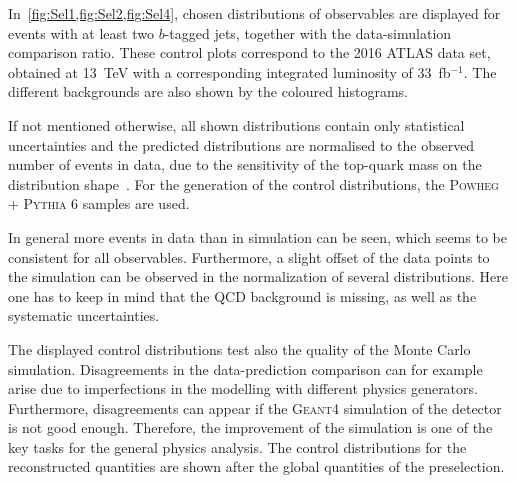 In~\cref{fig:Sel1,fig:Sel2,fig:Sel4}, chosen distributions of observables are displayed for events with at least two $b$-tagged jets, together with the data-simulation comparison ratio. These control plots correspond to the  2016 ATLAS data set, obtained at 13~TeV with a corresponding integrated luminosity of 33~fb$^{-1}$. The different backgrounds are also shown by the coloured histograms. 

If not mentioned otherwise, all shown distributions contain only statistical uncertainties and the  predicted distributions are normalised to the observed number of events in data, due to the sensitivity of the top-quark mass on the distribution shape~\cite{ATLAS-CONF-2017-071}. For the generation of  the control distributions, the \textsc{Powheg} + \textsc{Pythia 6} samples are used.

In general more events in data than in simulation can be seen, which seems to be consistent for all observables. Furthermore, a slight offset of the data points to the simulation can be observed in the normalization of several distributions.    
Here one has to keep in mind that the QCD background is missing, as well as the systematic uncertainties.


The displayed control distributions test also the quality of the Monte Carlo simulation.
Disagreements in the data-prediction comparison can for example  arise due to imperfections in the  modelling  with different physics generators. Furthermore, disagreements can appear if the \textsc{Geant4} simulation of the detector is not good enough. Therefore, the improvement of the simulation is one of the key tasks for the general physics analysis. 
The control distributions for the reconstructed quantities are shown after the global quantities of the preselection.





\clearpage

